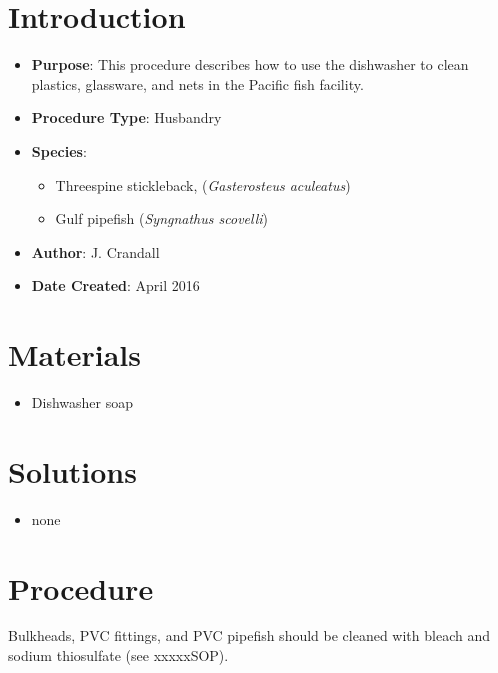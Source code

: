 \documentclass[
  letterpaper,
  DIV=11,
  numbers=noendperiod]{scrreprt}
\providecommand{\tightlist}{%
  \setlength{\itemsep}{0pt}\setlength{\parskip}{0pt}}\usepackage{longtable,booktabs,array}
\begin{document}
\hypertarget{introduction-40}{%
\section{Introduction}\label{introduction-40}}

\begin{itemize}
\tightlist
\item
  \textbf{Purpose}: This procedure describes how to use the dishwasher
  to clean plastics, glassware, and nets in the Pacific fish facility.
\item
  \textbf{Procedure Type}: Husbandry
\item
  \textbf{Species}:

  \begin{itemize}
  \tightlist
  \item
    Threespine stickleback, (\emph{Gasterosteus aculeatus})
  \item
    Gulf pipefish (\emph{Syngnathus scovelli})
  \end{itemize}
\item
  \textbf{Author}: J. Crandall
\item
  \textbf{Date Created}: April 2016
\end{itemize}

\hypertarget{materials-38}{%
\section{Materials}\label{materials-38}}

\begin{itemize}
\tightlist
\item
  Dishwasher soap
\end{itemize}

\hypertarget{solutions-30}{%
\section{Solutions}\label{solutions-30}}

\begin{itemize}
\tightlist
\item
  none
\end{itemize}

\hypertarget{procedure-39}{%
\section{Procedure}\label{procedure-39}}

\begin{tcolorbox}[enhanced jigsaw, rightrule=.15mm, title=\textcolor{quarto-callout-note-color}{\faInfo}\hspace{0.5em}{NOTE}, titlerule=0mm, opacitybacktitle=0.6, toprule=.15mm, bottomrule=.15mm, opacityback=0, left=2mm, colframe=quarto-callout-note-color-frame, breakable, coltitle=black, colback=white, colbacktitle=quarto-callout-note-color!10!white, bottomtitle=1mm, leftrule=.75mm, toptitle=1mm, arc=.35mm]

Bulkheads, PVC fittings, and PVC pipefish should be cleaned with bleach
and sodium thiosulfate (see xxxxxSOP).

\end{tcolorbox}
\end{document}
